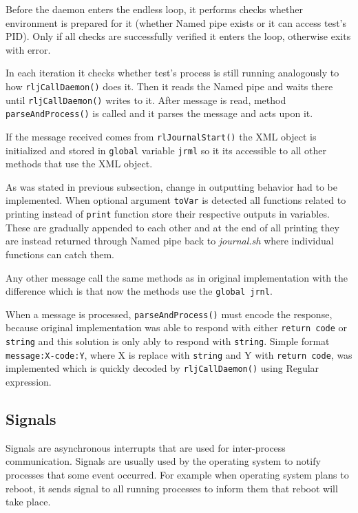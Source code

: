 Before the daemon enters the endless loop, it performs checks whether environment is prepared for it (whether Named pipe exists or it can access test's PID). Only if all checks are successfully verified it enters the loop, otherwise exits with error. 

In each iteration it checks whether test's  process is still running analogously to how \texttt{rljCallDaemon()} does it. Then it reads the Named pipe and waits there until \texttt{rljCallDaemon()} writes to it. After message is read, method \texttt{parseAndProcess()} is called and it parses the message and acts upon it. 

If the message received comes from \texttt{rlJournalStart()} the XML object is initialized and stored in \texttt{global} variable \texttt{jrml} so it its accessible to all other methods that use the XML object.

As was stated in previous subsection, change in outputting behavior had to be implemented. When optional argument \texttt{toVar} is detected all functions related to printing instead of \texttt{print} function store their respective outputs in variables. These are gradually appended to each other and at the end of all printing they are instead returned through Named pipe back to \textit{journal.sh} where individual functions can catch them.

Any other message call the same methods as in original implementation with the difference which is that now the methods use the \texttt{global jrnl}.

When a message is processed, \texttt{parseAndProcess()} must encode the response, because original implementation was able to respond with either \texttt{return code} or \texttt{string} and this solution is only ably to respond with \texttt{string}. Simple format \texttt{message:X-code:Y}, where X is replace with \texttt{string} and Y with \texttt{return code}, was implemented which is quickly decoded by \texttt{rljCallDaemon()} using Regular expression\cite{regex}.

\subsection{Signals}
Signals are asynchronous interrupts that are used for inter-process communication. Signals are usually used by the operating system to notify processes that some event occurred\cite{signals}. For example when operating system plans to reboot, it sends signal to all running processes to inform them that reboot will take place.

